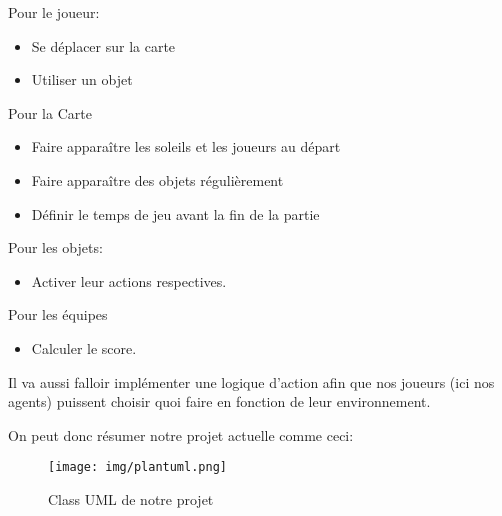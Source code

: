 \documentclass[11pt]{article}
\begin{document}
Pour le joueur:
\begin{itemize}
\item Se déplacer sur la carte
\item Utiliser un objet
\end{itemize}

Pour la Carte
\begin{itemize}
\item Faire apparaître les soleils et les joueurs au départ
\item Faire apparaître des objets régulièrement
\item Définir le temps de jeu avant la fin de la partie
\end{itemize}

Pour les objets:
\begin{itemize}
\item Activer leur actions respectives.
\end{itemize}

Pour les équipes
\begin{itemize}
\item Calculer le score.
\end{itemize}



Il va aussi falloir implémenter une logique d'action afin que nos joueurs (ici nos agents) puissent choisir quoi faire en fonction de leur environnement.

On peut donc résumer notre projet actuelle comme ceci:
\begin{figure}
  \centering
  \texttt{[image: img/plantuml.png]}
  \caption{Class UML de notre projet}
\end{figure}
\end{document}
